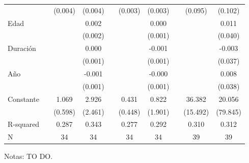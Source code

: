 \begin{table}[h]
{{\begin{threeparttable}
\begin{tabular}{l*{9}{S}}
				&&     (0.004)         &     (0.004)         &&     (0.003)         &     (0.003)         &&     (0.095)         &     (0.102)         \\
				Edad               &&                     &       0.002         &&                     &       0.000         &&                     &       0.011         \\
				&&                     &     (0.002)         &&                     &     (0.001)         &&                     &     (0.040)         \\
				Duración           &&                     &       0.000         &&                     &      -0.001         &&                     &      -0.003         \\
				&&                     &     (0.001)         &&                     &     (0.001)         &&                     &     (0.037)         \\
				Año                &&                     &      -0.001         &&                     &      -0.000         &&                     &       0.008         \\
				&&                     &     (0.001)         &&                     &     (0.001)         &&                     &     (0.038)         \\
				Constante           &&       1.069\sym{*}  &       2.926         &&       0.431         &       0.822         &&      36.382\sym{**} &      20.056         \\
				&&     (0.598)         &     (2.461)         &&     (0.448)         &     (1.901)         &&    (15.492)         &    (79.845)         \\
				\midrule           
				R-squared          &&       0.287         &       0.343         &&       0.277         &       0.292         &&       0.310         &       0.312         \\
				N                  &&          34         &          34         &&          34         &          34         &&          39         &          39         \\
					\hline \hline
				\end{tabular}
				\begin{tablenotes}
					\footnotesize{Notas: TO DO.}
				\end{tablenotes}
			\end{threeparttable}
		}
	}
\end{table}


